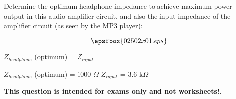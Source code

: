 

Determine the optimum headphone impedance to achieve maximum power output in this audio amplifier circuit, and also the input impedance of the amplifier circuit (as seen by the MP3 player):

$$\epsfbox{02502x01.eps}$$

$Z_{headphone}$ (optimum) = \hskip 80pt $Z_{input}$ = 







$Z_{headphone}$ (optimum) = 1000 $\Omega$ \hskip 50pt $Z_{input}$ = 3.6 k$\Omega$







{\bf This question is intended for exams only and not worksheets!}.





